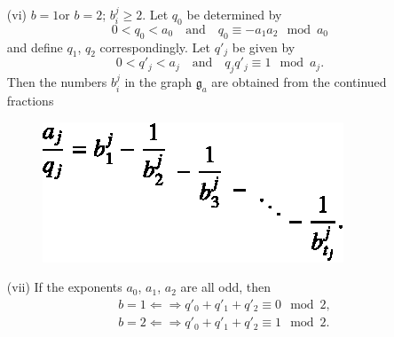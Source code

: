 \begin{theorem*}
\begin{itemize}
\item[\rm(vi)] $b=1$\pageoriginale or $b=2$; $b^{j}_{i}\geq 2$. Let $q_{0}$ be determined by
$$
0<q_{0}<a_{0}\quad\text{and}\quad q_{0}\equiv - a_{1}a_{2}\mod a_{0}
$$
and define $q_{1}$, $q_{2}$ correspondingly. Let $q'_{j}$ be given by
$$
0<q'_{j}<a_{j}\text{~~ and~~ } q_{j}q'_{j}\equiv 1\mod a_{j}.
$$
Then the numbers $b^{j}_{i}$ in the graph $\mathfrak{g}_{a}$ are obtained from the continued fractions
\begin{figure}[H]
\centering
\includegraphics{src/chap11/fig10.eps}
\end{figure}

\item[\rm(vii)] If the exponents $a_{0}$, $a_{1}$, $a_{2}$ are all odd, then
\begin{align*}
& b=1\Leftarrow \Rightarrow q'_{0}+q'_{1}+q'_{2}\equiv 0\mod 2,\\
& b=2\Leftarrow \Rightarrow q'_{0}+q'_{1}+q'_{2}\equiv 1\mod 2.
\end{align*}
\end{itemize}
\end{theorem*}

